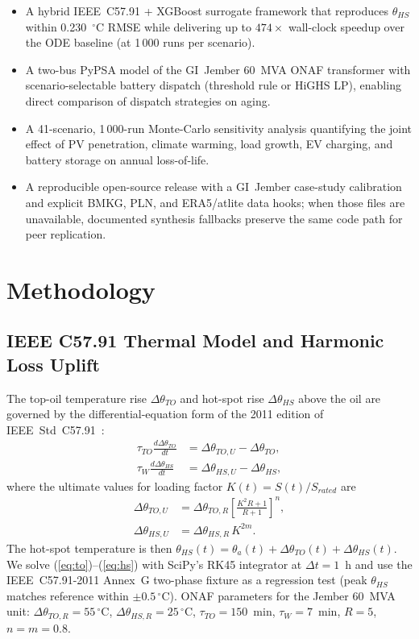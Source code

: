 \documentclass[conference]{IEEEtran}
\begin{document}
\begin{itemize}
    \item A hybrid IEEE~C57.91 + XGBoost surrogate framework that reproduces $\theta_{HS}$ within 0.230~$^\circ$C RMSE while delivering up to $474\times$ wall-clock speedup over the ODE baseline (at 1\,000 runs per scenario).
    \item A two-bus PyPSA model of the GI~Jember 60~MVA ONAF transformer with scenario-selectable battery dispatch (threshold rule or HiGHS LP), enabling direct comparison of dispatch strategies on aging.
    \item A 41-scenario, 1\,000-run Monte-Carlo sensitivity analysis quantifying the joint effect of PV penetration, climate warming, load growth, EV charging, and battery storage on annual loss-of-life.
    \item A reproducible open-source release with a GI~Jember case-study calibration and explicit BMKG, PLN, and ERA5/atlite data hooks; when those files are unavailable, documented synthesis fallbacks preserve the same code path for peer replication.
\end{itemize}

\section{Methodology}
\label{sec:method}

\subsection{IEEE C57.91 Thermal Model and Harmonic Loss Uplift}
\label{sec:method-thermal}
The top-oil temperature rise $\Delta\theta_{TO}$ and hot-spot rise $\Delta\theta_{HS}$ above the oil are governed by the differential-equation form of the 2011 edition of IEEE~Std~C57.91~\cite{ieee_c5791_2011,iec_60076_7_2018,lesieutre1997topoil}:
\begin{align}
\tau_{TO}\frac{d\Delta\theta_{TO}}{dt} &= \Delta\theta_{TO,U} - \Delta\theta_{TO}, \label{eq:to}\\
\tau_{W}\frac{d\Delta\theta_{HS}}{dt} &= \Delta\theta_{HS,U} - \Delta\theta_{HS}, \label{eq:hs}
\end{align}
where the ultimate values for loading factor $K(t) = S(t)/S_{rated}$ are
\begin{align}
\Delta\theta_{TO,U} &= \Delta\theta_{TO,R}\!\left[\frac{K^{2}\!R + 1}{R + 1}\right]^{\!n}\!, \\
\Delta\theta_{HS,U} &= \Delta\theta_{HS,R}\,K^{2m}.
\end{align}
The hot-spot temperature is then $\theta_{HS}(t) = \theta_{a}(t) + \Delta\theta_{TO}(t) + \Delta\theta_{HS}(t)$. We solve (\ref{eq:to})--(\ref{eq:hs}) with SciPy's RK45 integrator at $\Delta t = 1$~h and use the IEEE~C57.91-2011 Annex~G two-phase fixture as a regression test (peak $\theta_{HS}$ matches reference within $\pm 0.5\,^\circ$C). ONAF parameters for the Jember 60~MVA unit: $\Delta\theta_{TO,R} = 55\,^\circ$C, $\Delta\theta_{HS,R} = 25\,^\circ$C, $\tau_{TO} = 150$~min, $\tau_{W} = 7$~min, $R = 5$, $n = m = 0.8$.
\end{document}
